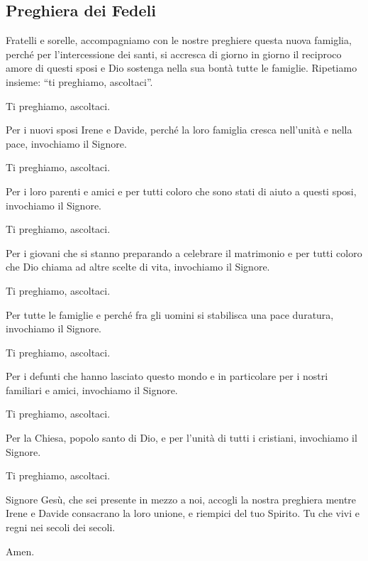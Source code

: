 
\subsection*{Preghiera dei Fedeli}

	\begin{dialoghi}
		\item[\sacerdote] Fratelli e sorelle, accompagniamo con le nostre preghiere questa nuova famiglia, perché per l'intercessione dei santi, si accresca di giorno in giorno il reciproco amore di questi sposi e Dio sostenga nella sua bontà tutte le famiglie. Ripetiamo insieme: \textquotedblleft ti preghiamo, ascoltaci\textquotedblright.
		\item[\assemblea] Ti preghiamo, ascoltaci.
		\item[\lettore] Per i nuovi sposi Irene e Davide, perché la loro famiglia cresca nell'unità e nella pace, invochiamo il Signore.
		\item[\assemblea] Ti preghiamo, ascoltaci.
		\item[\lettore] Per i loro parenti e amici e per tutti coloro che sono stati di aiuto a questi sposi, invochiamo il Signore.
		\item[\assemblea] Ti preghiamo, ascoltaci.
		\item[\lettore] Per i giovani che si stanno preparando a celebrare il matrimonio e per tutti coloro che Dio chiama ad altre scelte di vita, invochiamo il Signore.
		\item[\assemblea] Ti preghiamo, ascoltaci.
		\item[\lettore] Per tutte le famiglie e perché fra gli uomini si stabilisca una pace duratura, invochiamo il Signore.
		\item[\assemblea] Ti preghiamo, ascoltaci.
		\item[\lettore] Per i defunti che hanno lasciato questo mondo e in particolare per i nostri familiari e amici, invochiamo il Signore.
		\item[\assemblea] Ti preghiamo, ascoltaci.
		\item[\lettore] Per la Chiesa, popolo santo di Dio, e per l'unità di tutti i cristiani, invochiamo il Signore.
		\item[\assemblea] Ti preghiamo, ascoltaci.
		\item[\sacerdote] Signore Gesù, che sei presente in mezzo a noi, accogli la nostra preghiera mentre Irene e Davide consacrano la loro unione, e riempici del tuo Spirito. Tu che vivi e regni nei secoli dei secoli.
		\item[\assemblea] Amen.
	\end{dialoghi}


